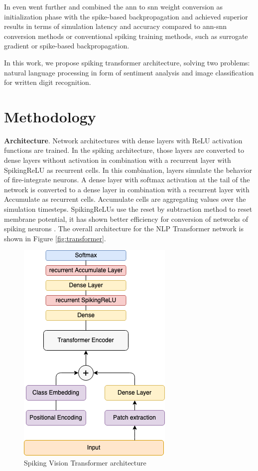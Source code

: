\documentclass{article}
\begin{document}
In \cite{hybrid_conversion} even went further and combined the ann to snn weight conversion as initialization phase with the spike-based backpropagation and achieved superior results in terms of simulation latency and accuracy compared to ann-snn conversion methods or conventional spiking training methods, such as surrogate gradient or spike-based backpropagation.

In this work, we propose spiking transformer architecture, solving two problems: natural language processing in form of sentiment analysis and image classification for written digit recognition.


\section{Methodology}
\textbf{Architecture}. Network architectures with dense layers with ReLU activation functions are trained. In the spiking architecture, those layers are converted to dense layers without activation in combination with a recurrent layer with SpikingReLU as recurrent cells. In this combination, layers simulate the behavior of fire-integrate neurons. A dense layer with softmax activation at the tail of the network is converted to a dense layer in combination with a recurrent layer with Accumulate as recurrent cells. Accumulate cells are aggregating values over the simulation timesteps. SpikingReLUs use the reset by subtraction method to reset membrane potential, it has shown better efficiency for conversion of networks of spiking neurons \cite{conversion_continuous_valued}. The overall architecture for the NLP Transformer network is shown in Figure \ref{fig:transformer}.

\begin{figure}[b!]
\begin{center}
\includegraphics[width=0.5 \textwidth]{SpikingVisionTransformer.png}
\caption{Spiking Vision Transformer architecture}
\label{fig:vision_transformer}
\end{center}
\end{figure}
\end{document}
